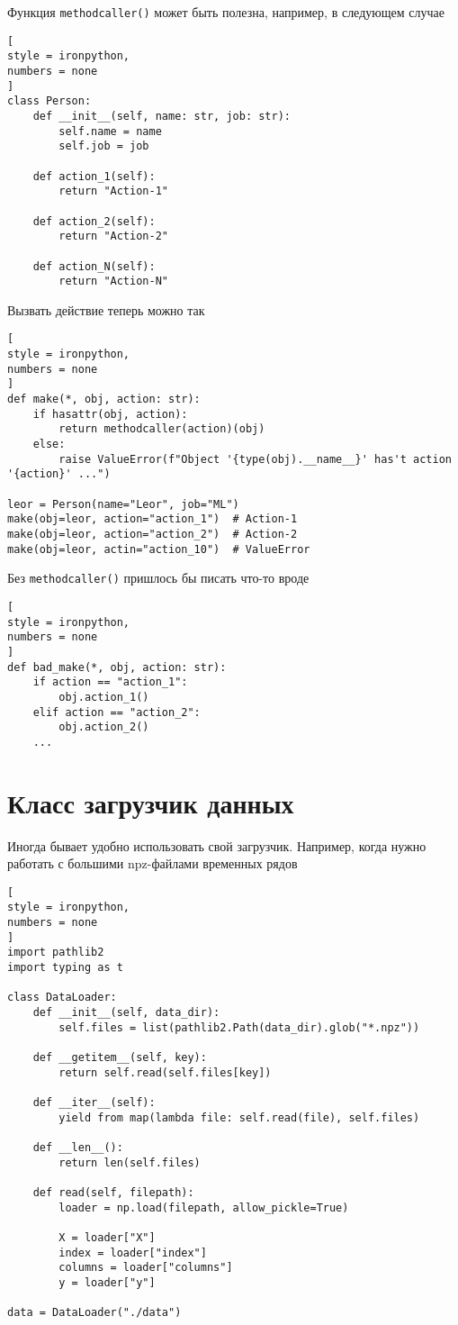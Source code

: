 \documentclass[%
	11pt,
	a4paper,
	utf8,
		]{article}
\begin{document}
Функция \texttt{methodcaller()} может быть полезна, например, в следующем случае
\begin{lstlisting}[
style = ironpython,
numbers = none
]
class Person:
    def __init__(self, name: str, job: str):
        self.name = name
        self.job = job
        
    def action_1(self):
        return "Action-1"
        
    def action_2(self):
        return "Action-2"
        
    def action_N(self):
        return "Action-N"
\end{lstlisting}

Вызвать действие теперь можно так
\begin{lstlisting}[
style = ironpython,
numbers = none
]
def make(*, obj, action: str):
    if hasattr(obj, action):
        return methodcaller(action)(obj)
    else:
        raise ValueError(f"Object '{type(obj).__name__}' has't action '{action}' ...")
        
leor = Person(name="Leor", job="ML")   
make(obj=leor, action="action_1")  # Action-1
make(obj=leor, action="action_2")  # Action-2
make(obj=leor, actin="action_10")  # ValueError
\end{lstlisting}

Без \texttt{methodcaller()} пришлось бы писать что-то вроде
\begin{lstlisting}[
style = ironpython,
numbers = none
]
def bad_make(*, obj, action: str):
    if action == "action_1":
        obj.action_1()
    elif action == "action_2":
        obj.action_2()
    ...
\end{lstlisting}

\section{Класс загрузчик данных}

Иногда бывает удобно использовать свой загрузчик. Например, когда нужно работать с большими npz-файлами временных рядов
\begin{lstlisting}[
style = ironpython,
numbers = none
]
import pathlib2
import typing as t

class DataLoader:
    def __init__(self, data_dir):
        self.files = list(pathlib2.Path(data_dir).glob("*.npz"))
        
    def __getitem__(self, key):
        return self.read(self.files[key])
        
    def __iter__(self):
        yield from map(lambda file: self.read(file), self.files)
        
    def __len__():
        return len(self.files)
        
    def read(self, filepath):
        loader = np.load(filepath, allow_pickle=True)
        
        X = loader["X"]
        index = loader["index"]
        columns = loader["columns"]
        y = loader["y"]
        
data = DataLoader("./data")
\end{lstlisting}
\end{document}
